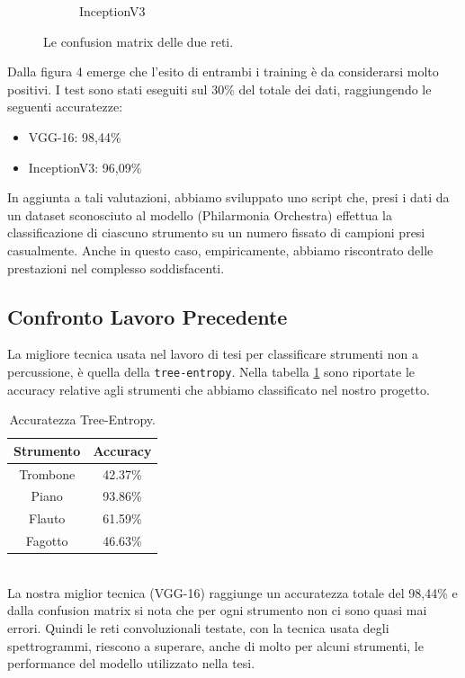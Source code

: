 \documentclass{article}
\begin{document}
\begin{figure}[h]
\begin{subfigure}{.5\textwidth}
      \caption{InceptionV3}
    \end{subfigure}
    \caption{Le confusion matrix delle due reti.}
    \label{fig:matrices}
\end{figure}
\clearpage
Dalla figura 4 emerge che l'esito di entrambi i training è da considerarsi molto positivi. I test sono stati eseguiti sul 30\% del totale dei dati,
raggiungendo le seguenti accuratezze:
\begin{itemize}
    \item VGG-16: 98,44\%
    \item InceptionV3: 96,09\%
\end{itemize}
In aggiunta a tali valutazioni, abbiamo sviluppato uno script che, presi i dati da un dataset sconosciuto al modello (Philarmonia Orchestra) 
effettua la classificazione di ciascuno strumento su un numero fissato di campioni presi casualmente. Anche in questo caso,
empiricamente, abbiamo riscontrato delle prestazioni nel complesso soddisfacenti. 

\subsection{Confronto Lavoro Precedente}
La migliore tecnica usata nel lavoro di tesi per classificare strumenti non a percussione, è quella della \texttt{tree-entropy}. Nella tabella \ref{tab:acc}
sono riportate le accuracy relative agli strumenti che abbiamo classificato nel nostro progetto.
\renewcommand{\arraystretch}{1.2}
\begin{table}[h]
    \centering
    \caption{Accuratezza Tree-Entropy.}
    \vspace*{3mm}
    \begin{tabular}{ c c } %
        \toprule
        Strumento & Accuracy \\
        \hline
        Trombone & 42.37\% \\
        Piano & 93.86\% \\
        Flauto & 61.59\% \\
        Fagotto & 46.63\% \\ 
        \bottomrule
    \end{tabular}
    \label{tab:acc}
\end{table} \\
La nostra miglior tecnica (VGG-16) raggiunge un accuratezza totale del 98,44\% e dalla confusion matrix si nota che per ogni strumento non ci sono quasi mai errori.
Quindi le reti convoluzionali testate, con la tecnica usata degli spettrogrammi, riescono a superare, anche di molto per alcuni strumenti, le performance del modello utilizzato nella tesi.
\end{document}
